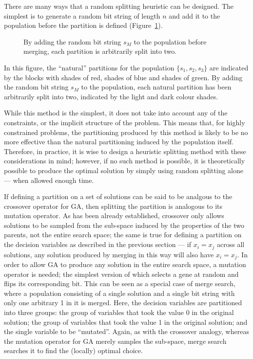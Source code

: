 \documentclass[preprint]{elsarticle}
\begin{document}
\medskip

There are many ways that a random splitting heuristic can be designed. The simplest is to generate a random bit string of length $n$ and add it to the population before the partition is defined (Figure~\ref{fig:random_split}). 

\begin{figure}[h]
\centering
{}
\caption[Splitting partitions by adding a random bit string]
       {By adding the random bit string $s_M$ to the population before merging, each partition is arbitrarily split into two.}
\label{fig:random_split}
\end{figure}

In this figure, the ``natural'' partitions for the population $\{s_1,s_2,s_3\}$ are indicated by the blocks with shades of red, shades of blue and shades of green. By adding the random bit string $s_M$ to the population, each natural partition has been arbitrarily split into two, indicated by the light and dark colour shades.

While this method is the simplest, it does not take into account any of the constraints, or the implicit structure of the problem. This means that, for highly constrained problems, the partitioning produced by this method is likely to be no more effective than the natural partitioning induced by the population itself. Therefore, in practice, it is wise to design a heuristic splitting method with these considerations in mind; however, if no such method is possible, it is theoretically possible to produce the optimal solution by simply using random splitting alone --- when allowed enough time.

\medskip

If defining a partition on a set of solutions can be said to be analgous to the crossover operator for GA, then splitting the partition is analogous to its mutation operator. As has been already established, crossover only allows solutions to be sampled from the sub-space induced by the properties of the two parents, not the entire search space; the same is true for defining a partition on the decision variables as described in the previous section --- if $x_i = x_j$ across all solutions, any solution produced by merging in this way will also have $x_i = x_j$. In order to allow GA to produce any solution in the entire search space, a mutation operator is needed; the simplest version of which selects a gene at random and flips its corresponding bit. This can be seen as a special case of merge search, where a population consisting of a single solution and a single bit string with only one arbitrary 1 in it is merged. Here, the decision variables are partitioned into three groups: the group of variables that took the value 0 in the original solution; the group of variables that took the value 1 in the original solution; and the single variable to be ``mutated''. Again, as with the crossover analogy, whereas the mutation operator for GA merely samples the sub-space, merge search searches it to find the (locally) optimal choice.
\end{document}
